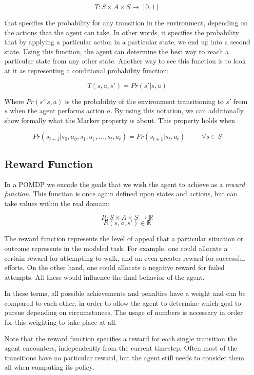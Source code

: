 \[ T: S\times A \times S \rightarrow [0,1] \]

that specifies the probability for any transition in the environment, depending on the actions that
the agent can take. In other words, it specifies the probability that by applying a particular
action in a particular state, we end up into a second state. Using this function, the agent can
determine the best way to reach a particular state from any other state. Another way to see this
function is to look at it as representing a conditional probability function:

\[ T(s, a, s') = Pr(s' | s, a) \]

Where $Pr(s'|s,a)$ is the probability of the environment transitioning to $s'$ from $s$ when the
agent performs action $a$. By using this notation, we can additionally show formally what the
Markov property is about. This property holds when

\[ Pr(s_{t+1} | s_{0}, a_{0}, s_{1}, a_{1}, ..., s_{t}, a_{t} ) = Pr(s_{t+1} | s_t, a_t ) \hspace{1cm} \forall s \in S \]

\subsection{Reward Function}

In a POMDP we encode the goals that we wish the agent to achieve as a \textit{reward function}.
This function is once again defined upon states and actions, but can take values within the real
domain:

\[ R: S\times A\times S \rightarrow \mathbb{R} \]
\[ R(s, a, s') \in \mathbb{R} \]

The reward function represents the level of appeal that a particular situation or outcome represents
in the modeled task. For example, one could allocate a certain reward for attempting to walk, and an
even greater reward for successful efforts. On the other hand, one could allocate a negative reward
for failed attempts. All these would influence the final behavior of the agent.

In these terms, all possible achievements and penalties have a weight and can be compared to each
other, in order to allow the agent to determine which goal to pursue depending on circumstances. The
usage of numbers is necessary in order for this weighting to take place at all.

Note that the reward function specifies a reward for each single transition the agent encounters,
independently from the current timestep. Often most of the transitions have no particular reward,
but the agent still needs to consider them all when computing its policy.

